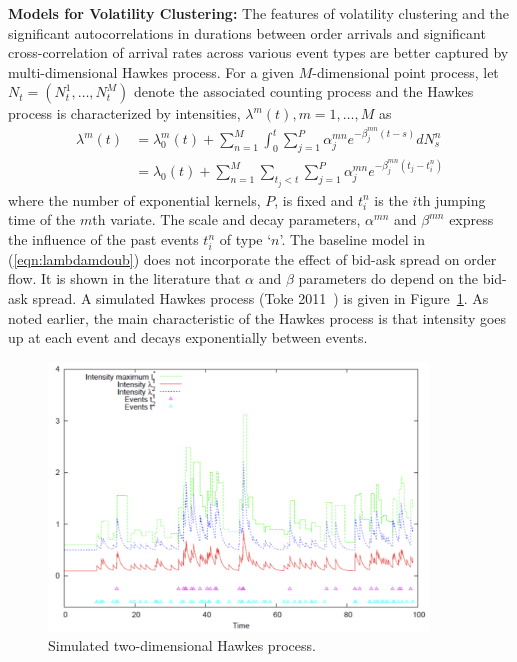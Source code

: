 \noindent\textbf{Models for Volatility Clustering:} The features of volatility clustering and the significant autocorrelations in durations between order arrivals and significant cross-correlation of arrival rates across various event types are better captured by multi-dimensional Hawkes process. For a given $M$-dimensional point process, let $N_t=(N_t^1,\ldots,N_t^M)$ denote the associated counting process and the Hawkes process is characterized by intensities, $\lambda^m(t), m=1,\ldots,M$ as
	\begin{equation}\label{eqn:lambdamdoub}
	\begin{split}
	\lambda^m(t)&= \lambda_0^m(t) + \sum_{n=1}^M \int_0^t \sum_{j=1}^P \alpha_j^{mn} e^{-\beta_j^{mn}(t-s)} dN_s^n \\
	&=\lambda_0(t) + \sum_{n=1}^M \sum_{t_j<t} \sum_{j=1}^P \alpha_j^{mn} e^{-\beta_j^{mn}(t_j -t_i^n)}
	\end{split}
	\end{equation}
where the number of exponential kernels, $P$, is fixed and $t_i^n$ is the $i$th jumping time of the $m$th variate. The scale and decay parameters, $\alpha^{mn}$ and $\beta^{mn}$ express the influence of the past events $t_i^n$ of type `$n$'. The baseline model in (\ref{eqn:lambdamdoub}) does not incorporate the effect of bid-ask spread on order flow. It is shown in the literature that $\alpha$ and $\beta$ parameters do depend on the bid-ask spread. A simulated Hawkes process (Toke 2011~\cite{toke}) is given in Figure~\ref{fig:hawkes}. As noted earlier, the main characteristic of the Hawkes process is that intensity goes up at each event and decays exponentially between events. 
	\begin{figure}[!ht]
   	\centering
   	\includegraphics[width=0.9\textwidth]{chapters/chapter_trade_data_models/figures/hawkes.png} 
   	\caption{Simulated two-dimensional Hawkes process. \label{fig:hawkes}}
	\end{figure}


